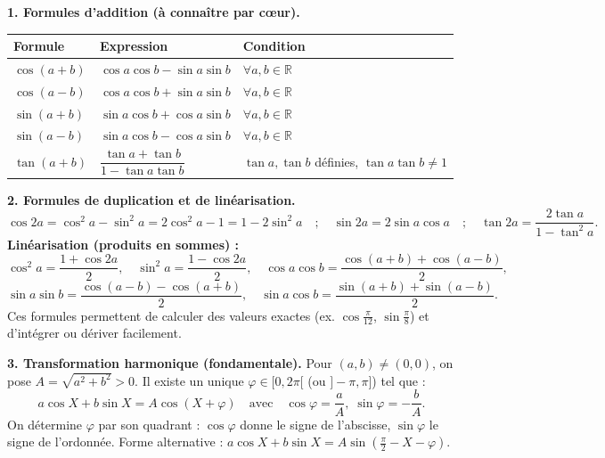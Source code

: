 \documentclass[11pt]{article}
\begin{document}
\begin{aretenir}
\textbf{1. Formules d'addition (à connaître par cœur).}
\begin{center}
\begin{tabularx}{\linewidth}{|l|X|X|}\hline
\rowcolor{popblueL} \textbf{Formule} & \textbf{Expression} & \textbf{Condition} \\ \hline
$\cos(a+b)$ & $\cos a\cos b-\sin a\sin b$ & $\forall a,b\in\mathbb{R}$ \\ \hline
$\cos(a-b)$ & $\cos a\cos b+\sin a\sin b$ & $\forall a,b\in\mathbb{R}$ \\ \hline
$\sin(a+b)$ & $\sin a\cos b+\cos a\sin b$ & $\forall a,b\in\mathbb{R}$ \\ \hline
$\sin(a-b)$ & $\sin a\cos b-\cos a\sin b$ & $\forall a,b\in\mathbb{R}$ \\ \hline
$\tan(a+b)$ & $\dfrac{\tan a+\tan b}{1-\tan a\tan b}$ & $\tan a,\tan b$ définies, $\tan a\tan b\neq 1$ \\ \hline
\end{tabularx}
\end{center}

\textbf{2. Formules de duplication et de linéarisation.}
\[
\cos 2a=\cos^2 a-\sin^2 a=2\cos^2 a-1=1-2\sin^2 a \quad ; \quad \sin 2a=2\sin a\cos a \quad ; \quad \tan 2a=\frac{2\tan a}{1-\tan^2 a}.
\]
\textbf{Linéarisation (produits en sommes) :}
\[
\cos^2 a=\frac{1+\cos 2a}{2},\quad \sin^2 a=\frac{1-\cos 2a}{2},\quad \cos a\cos b=\frac{\cos(a+b)+\cos(a-b)}{2},
\]
\[
\sin a\sin b=\frac{\cos(a-b)-\cos(a+b)}{2},\quad \sin a\cos b=\frac{\sin(a+b)+\sin(a-b)}{2}.
\]
Ces formules permettent de calculer des valeurs exactes (ex. $\cos\frac{\pi}{12}$, $\sin\frac{\pi}{8}$) et d'intégrer ou dériver facilement.

\textbf{3. Transformation harmonique (fondamentale).}
Pour $(a,b)\neq(0,0)$, on pose $A=\sqrt{a^2+b^2}>0$. Il existe un unique $\varphi\in[0,2\pi[$ (ou $]-\pi,\pi]$) tel que :
\[
\boxed{a\cos X+b\sin X=A\cos(X+\varphi)}
\quad\text{avec}\quad
\cos\varphi=\frac{a}{A},\;\sin\varphi=-\frac{b}{A}.
\]
On détermine $\varphi$ par son quadrant : $\cos\varphi$ donne le signe de l'abscisse, $\sin\varphi$ le signe de l'ordonnée.
Forme alternative : $a\cos X+b\sin X=A\sin\!\left(\frac{\pi}{2}-X-\varphi\right)$.


\end{aretenir}
\end{document}
